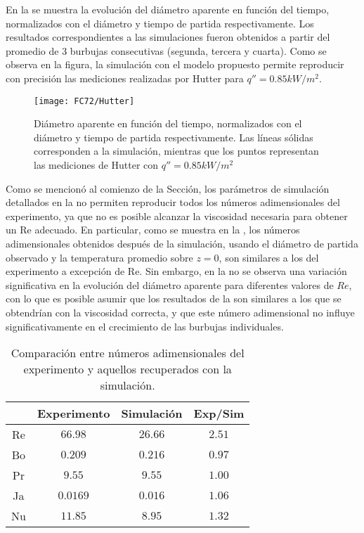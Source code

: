En la  se muestra la evoluci\'on del di\'ametro aparente en funci\'on del tiempo, normalizados con el di\'ametro y tiempo de partida respectivamente. Los resultados correspondientes a las simulaciones fueron obtenidos a partir del promedio de 3 burbujas consecutivas (segunda, tercera y cuarta). Como se observa en la figura, la simulaci\'on con el modelo propuesto permite reproducir con precisi\'on las mediciones realizadas por Hutter para $q'' = 0.85kW/m^2$.

\begin{figure}[ht]
	\centering
	\texttt{[image: FC72/Hutter]}
	\caption{Di\'ametro aparente en funci\'on del tiempo, normalizados con el di\'ametro y tiempo de partida respectivamente. Las l\'ineas s\'olidas corresponden a la simulaci\'on, mientras que los puntos representan las mediciones de Hutter con $q'' = 0.85kW/m^2$}
	\label{fig:d_vs_t}
\end{figure}

Como se mencion\'o al comienzo de la Secci\'on, los par\'ametros de simulaci\'on detallados en la  no permiten reproducir todos los n\'umeros adimensionales del experimento, ya que no es posible alcanzar la viscosidad necesaria para obtener un Re adecuado. En particular, como se muestra en la , los n\'umeros adimensionales obtenidos despu\'es de la simulaci\'on, usando el di\'ametro de partida observado y la temperatura promedio sobre $z=0$, son similares a los del experimento a excepci\'on de Re. Sin embargo, en la  no se observa una variaci\'on significativa en la evoluci\'on del di\'ametro aparente para diferentes valores de $Re$, con lo que es posible asumir que los resultados de la  son similares a los que se obtendr\'ian con la viscosidad correcta, y que este n\'umero adimensional no influye significativamente en el crecimiento de las burbujas individuales.

\begin{table}[ht]
	\centering
    \begin{tabular}{c c c c}
	    \toprule
         & \bf Experimento & \bf Simulaci\'on & \bf Exp/Sim\\
        \midrule
		Re & $66.98$  & $26.66$ & $2.51$ \\
		Bo & $0.209$  & $0.216$ & $0.97$ \\
		Pr & $9.55$   & $9.55$  & $1.00$ \\
		Ja & $0.0169$ & $0.016$ & $1.06$  \\
		Nu & $11.85$  & $8.95$  & $$1.32$$ \\		
        \bottomrule
	\end{tabular}
	\caption{Comparaci\'on entre n\'umeros adimensionales del experimento y aquellos recuperados con la simulaci\'on.}
	\label{tab:adim_reproducidos}
\end{table} 

